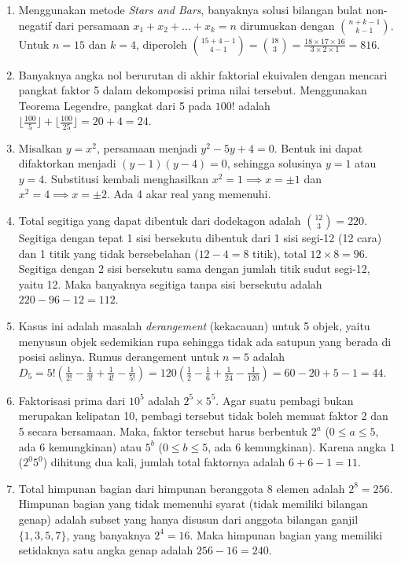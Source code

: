 \documentclass[12pt]{scrartcl}
\begin{document}
\begin{enumerate}
\item Menggunakan metode \textit{Stars and Bars}, banyaknya solusi bilangan bulat non-negatif dari persamaan $x_1 + x_2 + \dots + x_k = n$ dirumuskan dengan $\binom{n+k-1}{k-1}$. Untuk $n=15$ dan $k=4$, diperoleh $\binom{15+4-1}{4-1} = \binom{18}{3} = \frac{18 \times 17 \times 16}{3 \times 2 \times 1} = 816$.

\item Banyaknya angka nol berurutan di akhir faktorial ekuivalen dengan mencari pangkat faktor 5 dalam dekomposisi prima nilai tersebut. Menggunakan Teorema Legendre, pangkat dari 5 pada $100!$ adalah $\lfloor \frac{100}{5} \rfloor + \lfloor \frac{100}{25} \rfloor = 20 + 4 = 24$.

\item Misalkan $y = x^2$, persamaan menjadi $y^2 - 5y + 4 = 0$. Bentuk ini dapat difaktorkan menjadi $(y-1)(y-4) = 0$, sehingga solusinya $y = 1$ atau $y = 4$. Substitusi kembali menghasilkan $x^2 = 1 \implies x = \pm 1$ dan $x^2 = 4 \implies x = \pm 2$. Ada 4 akar real yang memenuhi.

\item Total segitiga yang dapat dibentuk dari dodekagon adalah $\binom{12}{3} = 220$. 
Segitiga dengan tepat 1 sisi bersekutu dibentuk dari 1 sisi segi-12 (12 cara) dan 1 titik yang tidak bersebelahan ($12-4=8$ titik), total $12 \times 8 = 96$. 
Segitiga dengan 2 sisi bersekutu sama dengan jumlah titik sudut segi-12, yaitu 12. 
Maka banyaknya segitiga tanpa sisi bersekutu adalah $220 - 96 - 12 = 112$.

\item Kasus ini adalah masalah \textit{derangement} (kekacauan) untuk 5 objek, yaitu menyusun objek sedemikian rupa sehingga tidak ada satupun yang berada di posisi aslinya. Rumus derangement untuk $n=5$ adalah $D_5 = 5! \left( \frac{1}{2!} - \frac{1}{3!} + \frac{1}{4!} - \frac{1}{5!} \right) = 120 \left( \frac{1}{2} - \frac{1}{6} + \frac{1}{24} - \frac{1}{120} \right) = 60 - 20 + 5 - 1 = 44$.

\item Faktorisasi prima dari $10^5$ adalah $2^5 \times 5^5$. Agar suatu pembagi bukan merupakan kelipatan 10, pembagi tersebut tidak boleh memuat faktor 2 dan 5 secara bersamaan. Maka, faktor tersebut harus berbentuk $2^a$ ($0 \le a \le 5$, ada 6 kemungkinan) atau $5^b$ ($0 \le b \le 5$, ada 6 kemungkinan). Karena angka $1$ ($2^0 5^0$) dihitung dua kali, jumlah total faktornya adalah $6 + 6 - 1 = 11$.

\item Total himpunan bagian dari himpunan beranggota 8 elemen adalah $2^8 = 256$. Himpunan bagian yang tidak memenuhi syarat (tidak memiliki bilangan genap) adalah subset yang hanya disusun dari anggota bilangan ganjil $\{1, 3, 5, 7\}$, yang banyaknya $2^4 = 16$. Maka himpunan bagian yang memiliki setidaknya satu angka genap adalah $256 - 16 = 240$.


\end{enumerate}
\end{document}
